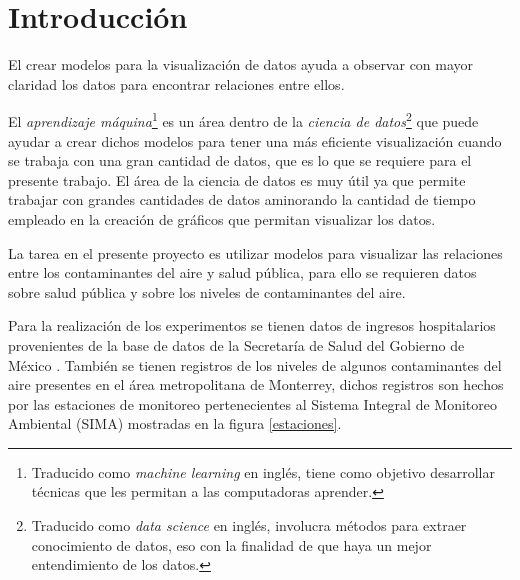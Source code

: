 \chapter{Introducción}
El crear modelos para la visualización de datos ayuda a observar con mayor claridad los datos para encontrar relaciones entre ellos.

El \emph{aprendizaje máquina}\footnote{Traducido como \emph{machine learning} en inglés, tiene como objetivo desarrollar técnicas que les permitan a las computadoras aprender.} es un área dentro de la \emph{ciencia de datos}\footnote{Traducido como \emph{data science} en inglés, involucra métodos para extraer conocimiento de datos, eso con la finalidad de que haya un mejor entendimiento de los datos.} que puede ayudar a crear dichos modelos para tener una más eficiente visualización cuando se trabaja con una gran cantidad de datos, que es lo que se requiere para el presente trabajo. El área de la ciencia de datos es muy útil ya que permite trabajar con grandes cantidades de datos aminorando la cantidad de tiempo empleado en la creación de gráficos que permitan visualizar los datos.

La tarea en el presente proyecto es utilizar modelos para visualizar las relaciones entre los contaminantes del aire y salud pública, para ello se requieren datos sobre salud pública y sobre los niveles de contaminantes del aire.

Para la realización de los experimentos se tienen datos de ingresos hospitalarios provenientes de la base de datos de la Secretaría de Salud del Gobierno de México \cite{f1}. También se tienen registros de los niveles de algunos contaminantes del aire presentes en el área metropolitana de Monterrey, dichos registros son hechos por las estaciones de monitoreo pertenecientes al Sistema Integral de Monitoreo Ambiental (SIMA) \cite{f2} mostradas en la figura \ref{estaciones}.

